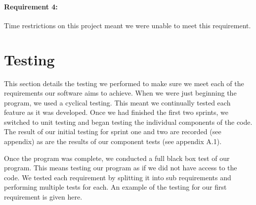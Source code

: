 \documentclass[a4paper, oneside, 11pt]{report}
\begin{document}
\subsubsection{Requirement 4:}
Time restrictions on this project meant we were unable to meet this requirement.

\chapter{Testing}

This section details the testing we performed to make sure we meet each of the requirements our software aims to achieve. When we were just beginning the program, we used a cyclical testing. This meant we continually tested each feature as it was developed. Once we had finished the first two sprints, we switched to unit testing and began testing the individual components of the code. The result of our initial testing for sprint one and two are recorded (see appendix) as are the results of our component tests (see appendix A.1).

Once the program was complete, we conducted a full black box test of our program. This means testing our program as if we did not have access to the code. We tested each requirement by splitting it into sub requirements and performing multiple tests for each. An example of the testing for our first requirement is given here.
\end{document}
